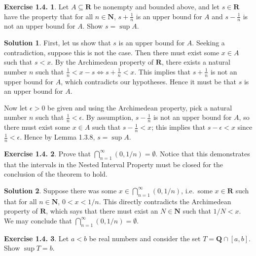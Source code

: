 \documentclass[12pt]{article}
\theoremstyle{definition}
\theoremstyle{exercise}
\newtheorem{exercise}{Exercise 1.4.}
\theoremstyle{solution}
\newtheorem*{solution}{Solution}
\newcommand{\N}{\mathbf{N}}
\newcommand{\Q}{\mathbf{Q}}
\newcommand{\R}{\mathbf{R}}
\begin{document}
\begin{exercise}
\label{ex:2}
    Let \( A \subseteq \R \) be nonempty and bounded above, and let \( s \in \R \) have the property that for all \( n \in \N \), \( s + \tfrac{1}{n} \) is an upper bound for \( A \) and \( s - \tfrac{1}{n} \) is not an upper bound for \( A \). Show \( s = \sup A \).
\end{exercise}

\begin{solution}
    First, let us show that \( s \) is an upper bound for \( A \). Seeking a contradiction, suppose this is not the case. Then there must exist some \( x \in A \) such that \( s < x \). By the Archimedean property of \( \R \), there exists a natural number \( n \) such that \( \tfrac{1}{n} < x - s \iff s + \tfrac{1}{n} < x \). This implies that \( s + \tfrac{1}{n} \) is not an upper bound for \( A \), which contradicts our hypotheses. Hence it must be that \( s \) is an upper bound for \( A \).

    Now let \( \epsilon > 0 \) be given and using the Archimedean property, pick a natural number \( n \) such that \( \tfrac{1}{n} < \epsilon \). By assumption, \( s - \tfrac{1}{n} \) is not an upper bound for \( A \), so there must exist some \( x \in A \) such that \( s - \tfrac{1}{n} < x \); this implies that \( s - \epsilon < x \) since \( \tfrac{1}{n} < \epsilon \). Hence by Lemma 1.3.8, \( s = \sup A \).
\end{solution}

\begin{exercise}
\label{ex:3}
    Prove that \( \bigcap_{n=1}^{\infty} (0, 1/n) = \emptyset \). Notice that this demonstrates that the intervals in the Nested Interval Property must be closed for the conclusion of the theorem to hold.
\end{exercise}

\begin{solution}
    Suppose there was some \( x \in \bigcap_{n=1}^{\infty} (0, 1/n) \), i.e.\ some \( x \in \R \) such that for all \( n \in \N \), \( 0 < x < 1/n \). This directly contradicts the Archimedean property of \( \R \), which says that there must exist an \( N \in \N \) such that \( 1/N < x \). We may conclude that \( \bigcap_{n=1}^{\infty} (0, 1/n) = \emptyset \).
\end{solution}

\begin{exercise}
\label{ex:4}
    Let \( a < b \) be real numbers and consider the set \( T = \Q \cap [a, b] \). Show \( \sup T = b \).
\end{exercise}
\end{document}
